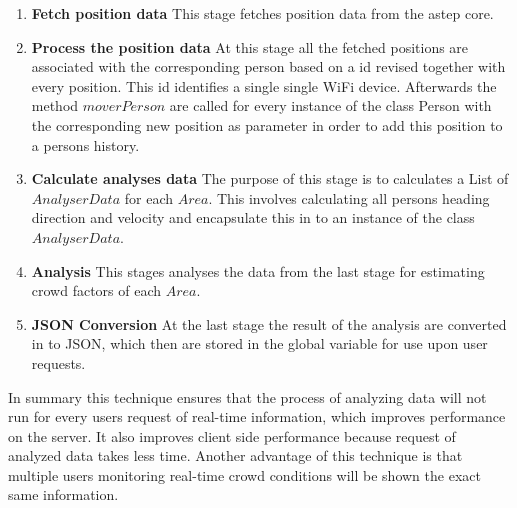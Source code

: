 \begin{enumerate}
    \item \textbf{Fetch position data} This stage fetches position data from the astep core.
    \item \textbf{Process the position data} At this stage all the fetched positions are associated with the corresponding person based on a id revised together with every position. This id identifies a single single WiFi device. Afterwards the method $moverPerson$ are called for every instance of the class Person with the corresponding new position as parameter in order to add this position to a persons history.
    \item \textbf{Calculate analyses data} The purpose of this stage is to calculates a List of $AnalyserData$ for each $Area$. This involves calculating all persons heading direction and velocity and encapsulate this in to an instance of the class $AnalyserData$.
    \item \textbf{Analysis} This stages analyses the data from the last stage for estimating  crowd factors of each $Area$.
    \item \textbf{JSON Conversion} At the last stage the result of the analysis are converted in to JSON, which then are stored in the global variable for use upon user requests. 
\end{enumerate}

In summary this technique ensures that the process of analyzing data will not run for every users request of real-time information, which improves performance on the server. It also improves client side performance because request of analyzed data takes less time. Another advantage of this technique is that multiple users monitoring real-time crowd conditions will be shown the exact same information.
